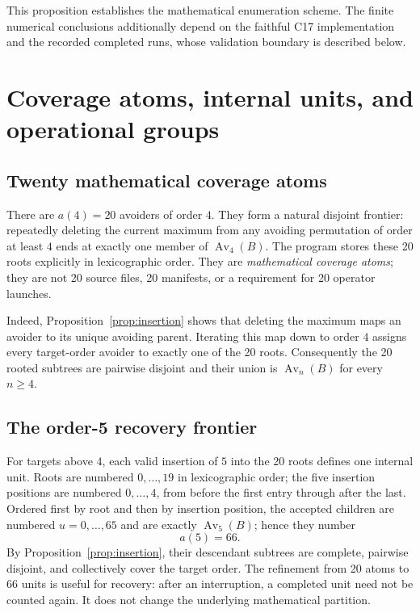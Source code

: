 \documentclass[11pt]{article}
\theoremstyle{definition}
\theoremstyle{remark}
\begin{document}
This proposition establishes the mathematical enumeration scheme.  The
finite numerical conclusions additionally depend on the faithful C17
implementation and the recorded completed runs, whose validation boundary is
described below.

\section{Coverage atoms, internal units, and operational groups}
\label{sec:coverage}

\subsection{Twenty mathematical coverage atoms}

There are $a(4)=20$ avoiders of order $4$.  They form a natural disjoint
frontier: repeatedly deleting the current maximum from any avoiding
permutation of order at least $4$ ends at exactly one member of
$\operatorname{Av}_4(B)$.  The program stores these 20 roots explicitly in
lexicographic order.  They are \emph{mathematical coverage atoms}; they are
not 20 source files, 20 manifests, or a requirement for 20 operator launches.

Indeed, Proposition~\ref{prop:insertion} shows that deleting the maximum maps
an avoider to its unique avoiding parent.  Iterating this map down to order
$4$ assigns every target-order avoider to exactly one of the 20 roots.
Consequently the 20 rooted subtrees are pairwise disjoint and their union is
$\operatorname{Av}_n(B)$ for every $n\geq4$.

\subsection{The order-5 recovery frontier}

For targets above $4$, each valid insertion of $5$ into the 20 roots defines
one internal unit.  Roots are numbered $0,\ldots,19$ in lexicographic order;
the five insertion positions are numbered $0,\ldots,4$, from before the first
entry through after the last.  Ordered first by root and then by insertion
position, the accepted children are numbered $u=0,\ldots,65$ and are exactly
$\operatorname{Av}_5(B)$; hence they number
\[
 a(5)=66.
\]
By Proposition~\ref{prop:insertion}, their descendant subtrees are complete,
pairwise disjoint, and collectively cover the target order.  The refinement
from 20 atoms to 66 units is useful for recovery: after an interruption, a
completed unit need not be counted again.  It does not change the underlying
mathematical partition.
\end{document}
